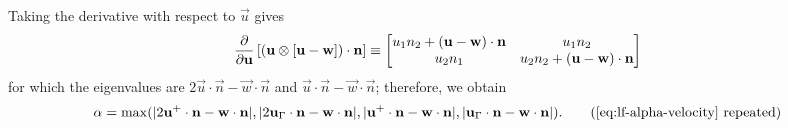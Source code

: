     Taking the derivative with respect to $\vec{u}$ gives
    \begin{equation*}
        \pdv{}{\boldsymbol{\mathbf{u}}}\left[ (\boldsymbol{\mathbf{u}} \otimes [\boldsymbol{\mathbf{u}} - \boldsymbol{\mathbf{w}}]) \cdot \boldsymbol{\mathbf{n}} \right] \equiv \begin{bmatrix}
            u_1n_2 + (\boldsymbol{\mathbf{u}} - \boldsymbol{\mathbf{w}}) \cdot \boldsymbol{\mathbf{n}} & u_1n_2 \\
            u_2n_1 & u_2n_2 + (\boldsymbol{\mathbf{u}} - \boldsymbol{\mathbf{w}}) \cdot \boldsymbol{\mathbf{n}}
        \end{bmatrix}
    \end{equation*}
    for which the eigenvalues are $2\vec{u} \cdot \vec{n} - \vec{w}\cdot\vec{n}$ and $\vec{u} \cdot \vec{n} - \vec{w}\cdot\vec{n}$; therefore, we obtain
    \begin{equation}
        \alpha = \max(|2\vec{u}^+\cdot\vec{n} - \vec{w} \cdot \vec{n}|, |2\vec{u}_\Gamma\cdot\vec{n} - \vec{w} \cdot \vec{n}|, |\vec{u}^+ \cdot \vec{n} - \vec{w} \cdot \vec{n}|, |\vec{u}_\Gamma \cdot \vec{n} - \vec{w} \cdot \vec{n}|).
        \retag{eq:lf-alpha-velocity}
    \end{equation}